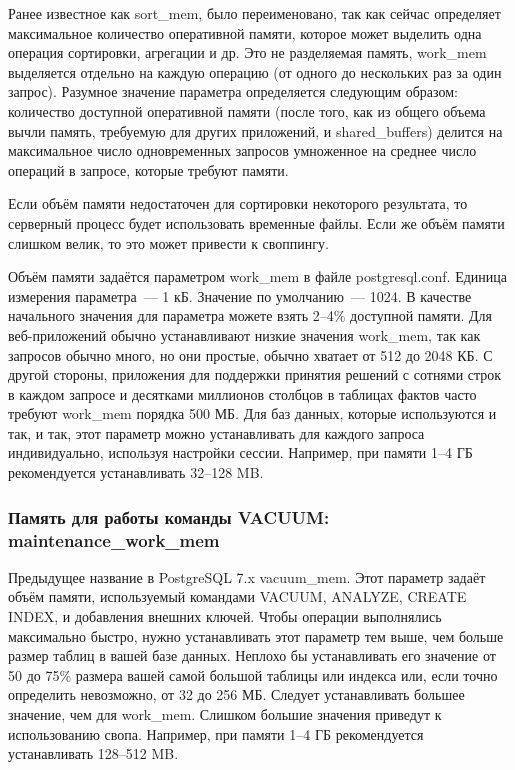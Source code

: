 Ранее известное как sort\_mem, было переименовано, так как сейчас определяет максимальное количество оперативной памяти, которое может выделить одна операция сортировки, агрегации и др. Это не разделяемая память, work\_mem выделяется отдельно на каждую операцию (от одного до нескольких раз за один запрос). Разумное значение параметра определяется следующим образом: количество доступной оперативной памяти (после того, как из общего объема вычли память, требуемую для других приложений, и shared\_buffers) делится на максимальное число одновременных запросов умноженное на среднее число операций в запросе, которые требуют памяти.

Если объём памяти недостаточен для сортировки некоторого результата, то серверный процесс будет использовать временные файлы. Если же объём памяти слишком велик, то это может привести к своппингу.

Объём памяти задаётся параметром work\_mem в файле postgresql.conf. Единица измерения параметра~--- 1 кБ. Значение по умолчанию~--- 1024. В качестве начального значения для параметра можете взять 2--4\% доступной памяти. Для веб-приложений обычно устанавливают низкие значения work\_mem, так как запросов обычно много, но они простые, обычно хватает
от 512 до 2048 КБ. С другой стороны, приложения для поддержки принятия решений с сотнями строк в каждом запросе и десятками миллионов столбцов  в таблицах фактов часто требуют work\_mem порядка 500 МБ. Для баз данных, которые используются и так, и так, этот параметр можно устанавливать для каждого запроса индивидуально, используя настройки сессии. Например, при памяти 1--4 ГБ рекомендуется устанавливать 32--128 MB.

\subsubsection{Память для работы команды VACUUM: maintenance\_work\_mem}

Предыдущее название в PostgreSQL 7.x vacuum\_mem. Этот параметр задаёт объём памяти, используемый командами VACUUM, ANALYZE, CREATE INDEX, и добавления внешних ключей. Чтобы операции выполнялись максимально быстро, нужно устанавливать этот параметр тем выше, чем больше размер таблиц в вашей базе данных. Неплохо бы устанавливать его значение от 50 до 75\% размера вашей самой большой таблицы или индекса или, если точно определить невозможно, от 32 до 256 МБ. Следует устанавливать большее значение, чем для work\_mem. Слишком большие значения приведут к использованию свопа. Например, при памяти 1--4 ГБ рекомендуется устанавливать 128--512 MB.

